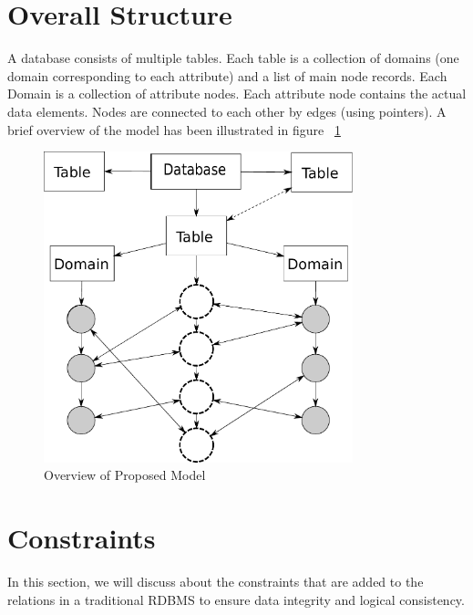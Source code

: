 \documentclass[12pt, oneside]{book}
\begin{document}
\section{Overall Structure}
A database consists of multiple tables. Each table is a collection of domains (one domain corresponding to each attribute) and a list of main node records. Each Domain is a collection of attribute nodes. Each attribute node contains the actual data elements. Nodes are connected to each other by edges (using pointers). A brief overview of the model has been illustrated in figure ~\ref{fig:overview}
\begin{figure}[t]
 \centering
 \includegraphics[width=0.8\textwidth]{pics/model.pdf}
 \caption{Overview of Proposed Model}
 \label{fig:overview}
\end{figure}

\section{Constraints}
In this section, we will discuss about the constraints that are added to the relations in a traditional RDBMS to ensure data integrity and logical consistency.
\end{document}
